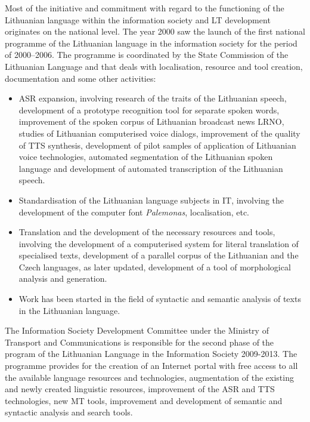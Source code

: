 \documentclass[]{../metanetpaper}
\begin{document}
\begin{multicols}{2}
Most of the initiative and commitment with regard to the functioning of the Lithuanian language within the information society and LT development originates on the national level. The year 2000 saw the launch of the first national programme of the Lithuanian language in the information society for the period of 2000–2006. The programme is coordinated by the State Commission of the Lithuanian Language and that deals with localisation, resource and tool creation, documentation and some other activities:
\begin{itemize}
      \item ASR expansion, involving research of the traits of the Lithuanian speech, development of a prototype recognition tool for separate spoken words, improvement of the spoken corpus of Lithuanian broadcast news LRNO, studies of Lithuanian computerised voice dialogs, improvement of the quality of TTS synthesis, development of pilot samples of application of Lithuanian voice technologies, automated segmentation of the Lithuanian spoken language and development of automated transcription of the Lithuanian speech.
      \item Standardisation of the Lithuanian language subjects in IT, involving the development of the computer font \textit{Palemonas}, localisation, etc.
      \item Translation and the development of the necessary resources and tools, involving the development of a computerised system for literal translation of specialised texts, development of a parallel corpus of the Lithuanian and the Czech languages, as later updated, development of a tool of morphological analysis and generation.
      \item Work has been started in the field of syntactic and semantic analysis of texts in the Lithuanian language. 
          \end{itemize}

    The Information Society Development Committee under the Ministry of Transport and Communications is responsible for the second phase of the program of the Lithuanian Language in the Information Society 2009-2013. The programme provides for the creation of an Internet portal with free access to all the available language resources and technologies, augmentation of the existing and newly created linguistic resources, improvement of the ASR and TTS technologies, new MT tools, improvement and development of semantic and syntactic analysis and search tools.


\end{multicols}
\end{document}
